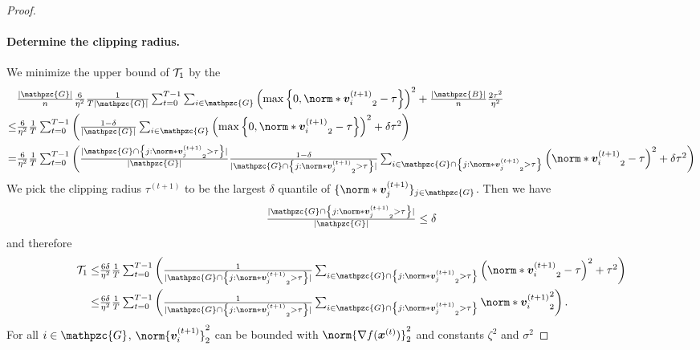 \documentclass{article}
\newcommand{\gset}{\ensuremath{{\mathpzc{G}}}}
\newcommand{\bset}{\ensuremath{{\mathpzc{B}}}}
\begin{document}
\begin{proof}
  \paragraph*{Determine the clipping radius.} We minimize the upper bound of $\mathcal{T}_1$ by the
  \begin{align*}
        & \tfrac{|\gset|}{n} \tfrac{6}{\eta^2}\tfrac{1}{T|\gset|}\tsum_{t=0}^{T-1}\tsum_{i\in\gset} \left(\max\left\{0, \norm*{\vv_i^{(t+1)}}_2-\tau\right\}\right)^2 + \tfrac{|\bset|}{n} \tfrac{ 2 \tau^2 }{\eta^2} \\
    \le & \tfrac{6}{\eta^2} \tfrac{1}{T} \tsum_{t=0}^{T-1} \left(
    \tfrac{1-\delta}{|\gset|} \tsum_{i\in\gset} \left(\max\left\{0, \norm*{\vv_i^{(t+1)}}_2-\tau\right\}\right)^2 + \delta\tau^2
    \right)                                                                                                                                                                                                           \\
    =   & \tfrac{6}{\eta^2} \tfrac{1}{T} \tsum_{t=0}^{T-1} \left(
    \tfrac{|\gset\cap\left\{j: \norm*{\vv_j^{(t+1)}}_2> \tau\right\}|}{|\gset|}
    \tfrac{1-\delta}{|\gset\cap\left\{j: \norm*{\vv_j^{(t+1)}}_2> \tau\right\}|} \tsum_{i\in\gset\cap\left\{j: \norm*{\vv_j^{(t+1)}}_2> \tau\right\} } \left(\norm*{\vv_i^{(t+1)}}_2-\tau\right)^2 + \delta\tau^2
    \right)
  \end{align*}
  We pick the clipping radius $\tau^{(t+1)}$ to be the largest $\delta$ quantile of $\{\norm*{\vv_j^{(t+1)}}\}_{j\in\gset}$. Then we have
  \begin{align*}
    \tfrac{|\gset\cap\left\{j: \norm*{\vv_j^{(t+1)}}_2> \tau\right\}|}{|\gset|} \le \delta
  \end{align*}
  and therefore
  \begin{align*}
    \cT_1 \le & \tfrac{6\delta}{\eta^2} \tfrac{1}{T} \tsum_{t=0}^{T-1} \left(
    \tfrac{1}{|\gset\cap\left\{j: \norm*{\vv_j^{(t+1)}}_2> \tau\right\}|} \tsum_{i\in\gset\cap\left\{j: \norm*{\vv_j^{(t+1)}}_2> \tau\right\} } \left(\norm*{\vv_i^{(t+1)}}_2-\tau\right)^2 + \tau^2
    \right)                                                                   \\
    \le       & \tfrac{6\delta}{\eta^2} \tfrac{1}{T} \tsum_{t=0}^{T-1} \left(
    \tfrac{1}{|\gset\cap\left\{j: \norm*{\vv_j^{(t+1)}}_2> \tau\right\}|} \tsum_{i\in\gset\cap\left\{j: \norm*{\vv_j^{(t+1)}}_2> \tau\right\} } \norm*{\vv_i^{(t+1)}}_2^2  \right).
  \end{align*}
  For all $i\in\gset$, $\norm{\vv_i^{(t+1)}}_2^2$ can be bounded with $\norm{\nabla f(\xx^{(t)})}_2^2$ and constants $\zeta^2$ and $\sigma^2$

\end{proof}
\end{document}
